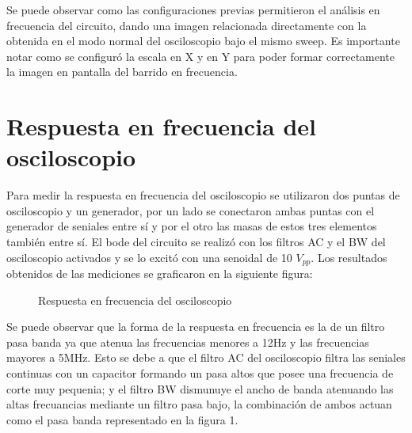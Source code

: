 Se puede observar como las configuraciones previas permitieron el
análisis en frecuencia del circuito, dando una imagen relacionada
directamente con la obtenida en el modo normal del osciloscopio bajo
el mismo sweep. Es importante notar como se configuró la escala en
X y en Y para poder formar correctamente la imagen en pantalla del
barrido en frecuencia.

\section{Respuesta en frecuencia del osciloscopio}

Para medir la respuesta en frecuencia del osciloscopio se utilizaron
dos puntas de osciloscopio y un generador, por un lado se conectaron
ambas puntas con el generador de seniales entre sí y por el otro las
masas de estos tres elementos también entre sí. El bode del circuito
se realizó con los filtros AC y el BW del osciloscopio activados y
se lo excitó con una senoidal de 10 $V_{pp}$. Los resultados obtenidos
de las mediciones se graficaron en la siguiente figura:
\begin{figure}[H]
\caption{Respuesta en frecuencia del osciloscopio}
\end{figure}

Se puede observar que la forma de la respuesta en frecuencia es la
de un filtro pasa banda ya que atenua las frecuencias menores a 12Hz
y las frecuencias mayores a 5MHz. Esto se debe a que el filtro AC
del osciloscopio filtra las seniales continuas con un capacitor formando
un pasa altos que posee una frecuencia de corte muy pequenia; y el
filtro BW dismunuye el ancho de banda atenuando las altas frecuancias
mediante un filtro pasa bajo, la combinación de ambos actuan como
el pasa banda representado en la figura 1.

